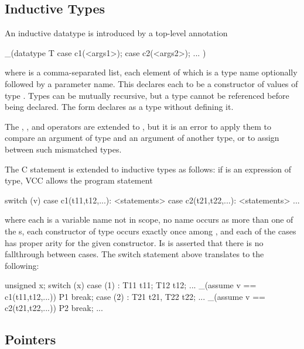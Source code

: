 \documentclass[preprint,nocopyrightspace]{sigplanconf}
\begin{document}
{{\subsection{Inductive Types}
An inductive datatype is introduced by a top-level annotation
\begin{VCC}
  _(datatype T {
    case c1(<args1>);
    case c2(<args2>);
    ...
  })
\end{VCC}
where  is a comma-separated list, each element of which is
a type name optionally followed by a parameter name. This
declares each  to be a constructor of values of
type . Types can be mutually recursive, but a type cannot be referenced
before being declared. The form  declares  as a
type without defining it.

The \vcc{==}, \vcc{!=}, and \vcc{=} operators are extended to , but
it is an error to apply them to compare an argument of type 
and an argument of another type, or to assign between such mismatched types.

The C  statement is extended to inductive types as
follows: if  is an expression of type, VCC allows the program statement 
\begin{VCC}
switch (v) {
  case c1(t11,t12,...): <statements>
  case c2(t21,t22,...): <statements>
  ...
}
\end{VCC}
where each  is a variable name not in scope, no name occurs
as more than one of the s, each constructor of type 
occurs exactly once among , and each of the cases has
proper arity for the given constructor. Is is asserted that there is
no fallthrough between cases. The switch statement above translates to
the following:
\begin{VCC}
{
  unsigned x;
  switch (x) {
    case (1) : {
      T11 t11; T12 t12; ...
      _(assume v == c1(t11,t12,...))
      { P1 }
      break;
    } case (2) : {
      T21 t21, T22 t22; ...
      _(assume v == c2(t21,t22,...))
      { P2 }
      break;
    } ...
  }
}
\end{VCC}

\subsection{Pointers}

}}
\end{document}
